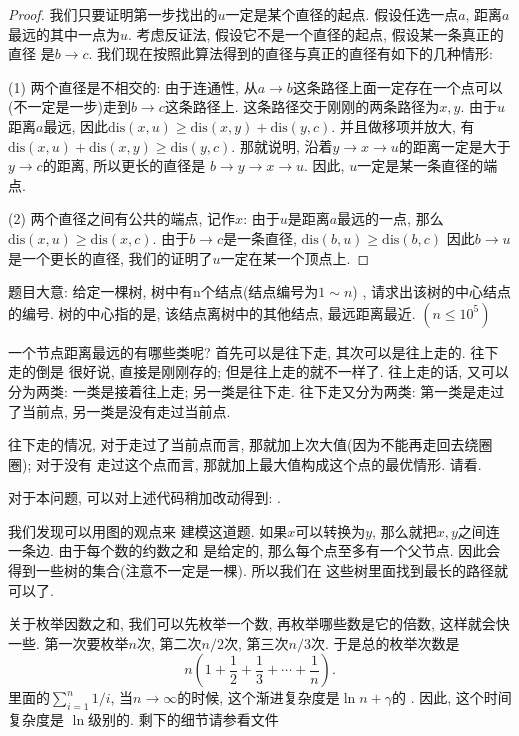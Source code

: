 \begin{proof}
    我们只要证明第一步找出的$u$一定是某个直径的起点. 假设任选一点$a$, 距离$a$
    最远的其中一点为$u$. 考虑反证法, 假设它不是一个直径的起点, 假设某一条真正的直径
    是$b\to c$. 我们现在按照此算法得到的直径与真正的直径有如下的几种情形: 

    (1) 两个直径是不相交的: 由于连通性, 从$a\to b$这条路径上面一定存在一个点可以
    (不一定是一步)走到$b\to c$这条路径上. 这条路径交于刚刚的两条路径为$x, y$. 
    由于$u$距离$a$最远, 因此$\text{dis}(x, u)\geq \text{dis}(x,y)+\text{dis}(y,c)$. 
    并且做移项并放大, 有$\text{dis}(x, u)+\text{dis}(x,y) \geq \text{dis}(y,c)$.
    那就说明, 沿着$y\to x\to u$的距离一定是大于$y\to c$的距离, 所以更长的直径是
    $b\to y\to x\to u$. 因此, $u$一定是某一条直径的端点. 
    
    (2) 两个直径之间有公共的端点, 记作$x$: 由于$u$是距离$a$最远的一点, 那么
    $\text{dis}{(x,u)}\geq \text{dis}{(x, c)}$. 由于$b\to c$是一条直径, $\text{dis}(b,u)\geq \text{dis}(b,c)$
    因此$b\to u$是一个更长的直径, 我们的证明了$u$一定在某一个顶点上. 
    
\end{proof}

题目大意: 给定一棵树, 树中有n个结点(结点编号为$1\sim n$)
, 请求出该树的中心结点的编号. 树的中心指的是, 该结点离树中的其他结点, 最远距离最近. $(n\leq 10^5)$

一个节点距离最远的有哪些类呢? 首先可以是往下走, 其次可以是往上走的. 往下走的倒是
很好说, 直接是刚刚存的; 但是往上走的就不一样了. 往上走的话, 又可以分为两类: 一类是接着往上走; 
另一类是往下走. 往下走又分为两类: 第一类是走过了当前点, 另一类是没有走过当前点. 

往下走的情况, 对于走过了当前点而言, 那就加上次大值(因为不能再走回去绕圈圈); 对于没有
走过这个点而言, 那就加上最大值构成这个点的最优情形. 请看.

对于本问题, 可以对上述代码稍加改动得到: .

 我们发现可以用图的观点来
建模这道题. 如果$x$可以转换为$y$, 那么就把$x, y$之间连一条边. 由于每个数的约数之和
是给定的, 那么每个点至多有一个父节点. 因此会得到一些树的集合(注意不一定是一棵). 所以我们在
这些树里面找到最长的路径就可以了. 

关于枚举因数之和, 我们可以先枚举一个数, 再枚举哪些数是它的倍数, 这样就会快一些. 
第一次要枚举$n$次, 第二次$n/2$次, 第三次$n/3$次. 于是总的枚举次数是
$$
n\left(1+\frac12 +\frac13+\cdots + \frac1n\right).
$$
里面的$\sum_{i=1}^{n} 1/i$, 当$n\to \infty$的时候, 这个渐进复杂度是$\ln n + \gamma$的
. 
因此, 这个时间复杂度是
$\ln$级别的. 剩下的细节请参看文件

